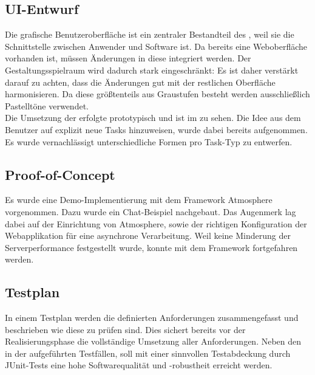 \subsection{UI-Entwurf}
\label{sub:UI-Entwurf}
Die grafische Benutzeroberfläche ist ein zentraler Bestandteil des , weil sie die Schnittstelle zwischen Anwender
und Software ist. Da bereits eine Weboberfläche vorhanden ist, müssen Änderungen in diese integriert werden. Der
Gestaltungsspielraum wird dadurch stark eingeschränkt: Es ist daher verstärkt darauf zu achten, dass die Änderungen gut mit der
restlichen Oberfläche harmonisieren. Da diese größtenteils aus Graustufen besteht werden ausschließlich Pastelltöne verwendet.\\
Die Umsetzung der  erfolgte prototypisch und ist im  zu sehen. Die Idee aus
 dem Benutzer auf explizit neue Tasks hinzuweisen, wurde dabei bereits aufgenommen. Es wurde
vernachlässigt unterschiedliche Formen pro Task-Typ zu entwerfen.


\subsection{Proof-of-Concept}
\label{sub:Proof-of-Concept}
Es wurde eine Demo-Implementierung mit dem Framework Atmosphere vorgenommen. Dazu wurde ein Chat-Beispiel nachgebaut. Das
Augenmerk lag dabei auf der Einrichtung von Atmosphere, sowie der richtigen Konfiguration der Webapplikation für eine asynchrone
Verarbeitung. Weil keine Minderung der Serverperformance festgestellt wurde, konnte mit dem Framework fortgefahren werden.


\subsection{Testplan}
\label{sub:Testplan}
In einem Testplan werden die definierten Anforderungen zusammengefasst und beschrieben wie diese zu prüfen sind. Dies sichert
bereits vor der Realisierungsphase die vollständige Umsetzung aller Anforderungen. Neben den in der 
aufgeführten Testfällen, soll mit einer sinnvollen Testabdeckung durch JUnit-Tests eine hohe Softwarequalität und -robustheit
erreicht werden.
